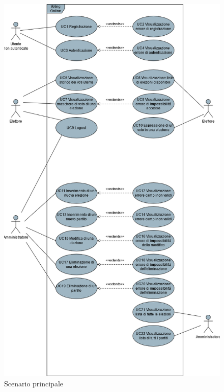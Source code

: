 \begin{figure}[h!] 
    \centering 
    \includegraphics[width=0.9\columnwidth]{immagini/cap3/SchemaGenerale.png}
    \caption{Scenario principale}
\end{figure}

\clearpage

